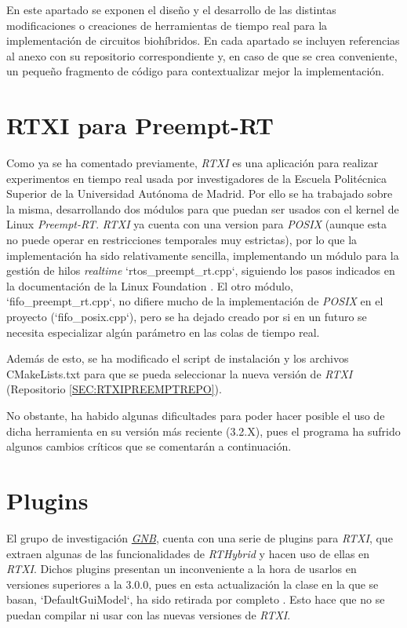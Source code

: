 
En este apartado se exponen el diseño y el desarrollo de las distintas modificaciones o creaciones de herramientas de tiempo real para la implementación de circuitos biohíbridos. En cada apartado se incluyen referencias al anexo con su repositorio correspondiente y, en caso de que se crea conveniente, un pequeño fragmento de código para contextualizar mejor la implementación.


\section{RTXI para Preempt-RT\label{SEC:RTXIPREEMPTRT}}

Como ya se ha comentado previamente, \textit{RTXI} es una aplicación para realizar experimentos en tiempo real usada por investigadores de la Escuela Politécnica Superior de la Universidad Autónoma de Madrid. Por ello se ha trabajado sobre la misma, desarrollando dos módulos para que puedan ser usados con el kernel de Linux \textit{Preempt-RT}. \textit{RTXI} ya cuenta con una version para \textit{POSIX} (aunque esta no puede operar en restricciones temporales muy estrictas), por lo que la implementación ha sido relativamente sencilla, implementando un módulo para la gestión de hilos \textit{realtime} `rtos\_preempt\_rt.cpp`, siguiendo los pasos indicados en la documentación de la Linux Foundation \cite{TheLinuxFundation2023}. El otro módulo, `fifo\_preempt\_rt.cpp`, no difiere mucho de la implementación de \textit{POSIX} en el proyecto (`fifo\_posix.cpp`), pero se ha dejado creado por si en un futuro se necesita especializar algún parámetro en las colas de tiempo real.

Además de esto, se ha modificado el script de instalación y los archivos CMakeLists.txt para que se pueda seleccionar la nueva versión de \textit{RTXI} (Repositorio \ref{SEC:RTXIPREEMPTREPO}).

No obstante, ha habido algunas dificultades para poder hacer posible el uso de dicha herramienta en su versión más reciente (3.2.X), pues el programa ha sufrido algunos cambios críticos que se comentarán a continuación.


\section{Plugins\label{SEC:PLUGINS}}


El grupo de investigación \href{http://arantxa.ii.uam.es/~gnb/}{\textit{GNB}}, cuenta con una serie de plugins para \textit{RTXI}, que extraen algunas de las funcionalidades de \textit{RTHybrid} \cite{Reyes-Sanchez2020, Amaducci2019} y hacen uso de ellas en \textit{RTXI}. Dichos plugins presentan un inconveniente a la hora de usarlos en versiones superiores a la 3.0.0, pues en esta actualización la clase en la que se basan, `DefaultGuiModel`, ha sido retirada por completo \cite{RTXI2023}. Esto hace que no se puedan compilar ni usar con las nuevas versiones de \textit{RTXI}.


